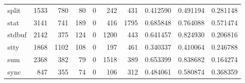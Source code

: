 \begin{tabular}{lrrrrrrrrr}
split     &                                1533 &                                             780 &                                             80 &                                             0 &                                            242 &                                          431 &                                           0.412590 &                               0.491194 &                             0.281148 \\
stat      &                                3141 &                                             741 &                                            189 &                                             0 &                                            416 &                                         1795 &                                           0.685848 &                               0.764088 &                             0.571474 \\
stdbuf    &                                2142 &                                             375 &                                            124 &                                             0 &                                           1200 &                                          443 &                                           0.641457 &                               0.824930 &                             0.206816 \\
stty      &                                1868 &                                            1102 &                                            108 &                                             0 &                                            197 &                                          461 &                                           0.340337 &                               0.410064 &                             0.246788 \\
sum       &                                2368 &                                             382 &                                             79 &                                             0 &                                           1518 &                                          389 &                                           0.653399 &                               0.838682 &                             0.164274 \\
sync      &                                 847 &                                             355 &                                             74 &                                             0 &                                            106 &                                          312 &                                           0.484061 &                               0.580874 &                             0.368359 \\

\end{tabular}
